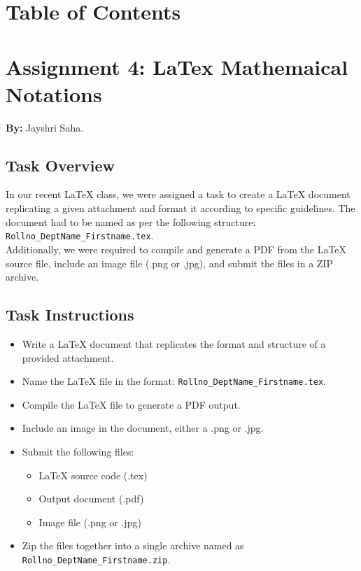 \documentclass[a4paper,12pt]{article}
\begin{document}
    \section*{Table of Contents}
\tableofcontents

\vspace{1cm}

\newpage

\section{Assignment 4: LaTex Mathemaical Notations}
\textbf{By:} Jayshri Saha.


\subsection{Task Overview}

In our recent LaTeX class, we were assigned a task to create a LaTeX document replicating a given attachment and format it according to specific guidelines. The document had to be named as per the following structure:\\ \texttt{Rollno\_DeptName\_Firstname.tex}.\\ 
Additionally, we were required to compile and generate a PDF from the LaTeX source file, include an image file (.png or .jpg), and submit the files in a ZIP archive.

\subsection{Task Instructions}

\begin{itemize}
    \item Write a LaTeX document that replicates the format and structure of a provided attachment.
    \item Name the LaTeX file in the format: \texttt{Rollno\_DeptName\_Firstname.tex}.
    \item Compile the LaTeX file to generate a PDF output.
    \item Include an image in the document, either a .png or .jpg.
    \item Submit the following files:
    \begin{itemize}
        \item LaTeX source code (.tex)
        \item Output document (.pdf)
        \item Image file (.png or .jpg)
    \end{itemize}
    \item Zip the files together into a single archive named as \texttt{Rollno\_DeptName\_Firstname.zip}.
\end{itemize}
\end{document}
